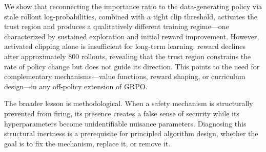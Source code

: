 We show that reconnecting the importance ratio to the data-generating policy via stale rollout log-probabilities, combined with a tight clip threshold, activates the trust region and produces a qualitatively different training regime---one characterized by sustained exploration and initial reward improvement.
However, activated clipping alone is insufficient for long-term learning: reward declines after approximately 800 rollouts, revealing that the trust region constrains the rate of policy change but does not guide its direction.
This points to the need for complementary mechanisms---value functions, reward shaping, or curriculum design---in any off-policy extension of GRPO.

The broader lesson is methodological.
When a safety mechanism is structurally prevented from firing, its presence creates a false sense of security while its hyperparameters become unidentifiable nuisance parameters.
Diagnosing this structural inertness is a prerequisite for principled algorithm design, whether the goal is to fix the mechanism, replace it, or remove it.
